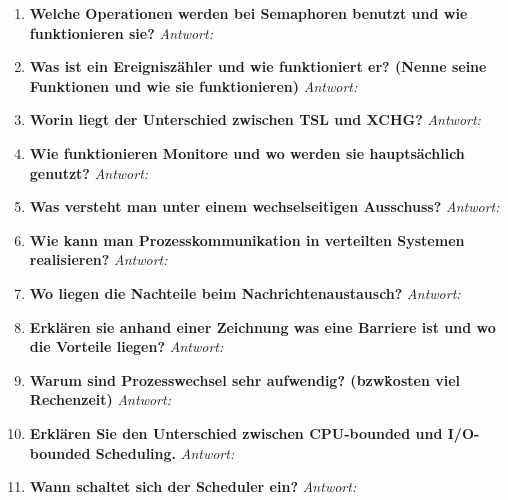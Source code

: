 \begin{enumerate}[label=\arabic*.]
      \item \textbf{Welche Operationen werden bei Semaphoren benutzt und wie funktionieren sie?} \newline
            \textit{Antwort:}

      \item \textbf{Was ist ein Ereigniszähler und wie funktioniert er? (Nenne seine Funktionen und wie sie
                  funktionieren)} \newline
            \textit{Antwort:}

      \item \textbf{Worin liegt der Unterschied zwischen TSL und XCHG?} \newline
            \textit{Antwort:}

      \item \textbf{Wie funktionieren Monitore und wo werden sie hauptsächlich genutzt?} \newline
            \textit{Antwort:}

      \item \textbf{Was versteht man unter einem wechselseitigen Ausschuss?} \newline
            \textit{Antwort:}

      \item \textbf{Wie kann man Prozesskommunikation in verteilten Systemen realisieren?} \newline
            \textit{Antwort:}

      \item \textbf{Wo liegen die Nachteile beim Nachrichtenaustausch?} \newline
            \textit{Antwort:}

      \item \textbf{Erklären sie anhand einer Zeichnung was eine Barriere ist und wo die Vorteile liegen?} \newline
            \textit{Antwort:}

      \item \textbf{Warum sind Prozesswechsel sehr aufwendig? (bzw\. kosten viel Rechenzeit)} \newline
            \textit{Antwort:}

      \item \textbf{Erklären Sie den Unterschied zwischen CPU-bounded und I/O-bounded Scheduling.} \newline
            \textit{Antwort:}

      \item \textbf{Wann schaltet sich der Scheduler ein?} \newline
            \textit{Antwort:}


\end{enumerate}
